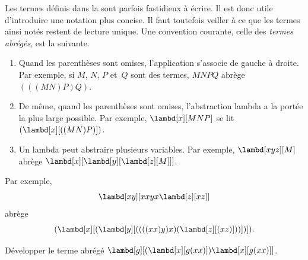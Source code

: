\documentclass[../../../include/open-logic-section]{subfiles}
\begin{document}

Les termes définis dans la 
sont parfois fastidieux à écrire. Il est donc
utile d'introduire une notation plus concise.
Il faut toutefois veiller à ce que les termes
ainsi notés restent de lecture unique. Une
convention courante, celle des \emph{termes
abrégés}, est la suivante.

\begin{enumerate}
\item Quand les parenthèses sont omises,
  l'application s'associe de gauche à droite.
  Par exemple, si $M$, $N$, $P$ et~$Q$ sont
  des termes, $MNPQ$ abrège $(((MN)P)Q)$.
\item De même, quand les parenthèses sont omises,
  l'abstraction lambda a la portée la plus
  large possible. Par exemple,
  $\lambd[x][MNP]$ se lit
  $(\lambd[x][((MN)P)])$.
\item Un lambda peut abstraire plusieurs
  variables. Par exemple,
  $\lambd[xyz][M]$ abrège
  $\lambd[x][\lambd[y][\lambd[z][M]]]$.
\end{enumerate}

Par exemple,
\[
\lambd[xy][xxyx \lambd[z][xz]]
\]
abrège
\[
(\lambd[x][(\lambd[y][((((xx)y)x)(\lambd[z][(xz)]))])]).
\]

\begin{prob}
Développer le terme abrégé
$\lambd[g][(\lambd[x][g (x x)])
  \lambd[x][g (x x)]]$.
\end{prob}
\end{document}

